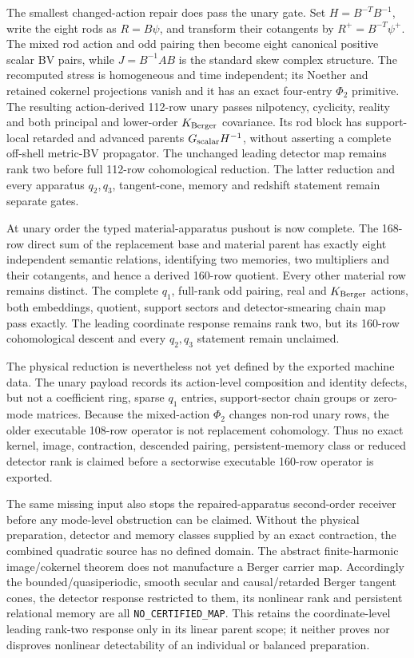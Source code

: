 \documentclass[11pt]{article}
\theoremstyle{definition}
\theoremstyle{remark}
\begin{document}
The smallest changed-action repair does pass the unary gate.  Set
\(H=B^{-T}B^{-1}\), write the eight rods as \(R=B\psi\), and transform
their cotangents by \(R^+=B^{-T}\psi^+\).  The mixed rod action and odd
pairing then become eight canonical positive scalar BV pairs, while
\(J=B^{-1}AB\) is the standard skew complex structure.  The recomputed
stress is homogeneous and time independent; its Noether and retained
cokernel projections vanish and it has an exact four-entry
\(\Phi_2\) primitive.  The resulting action-derived 112-row unary passes
nilpotency, cyclicity, reality and both principal and lower-order
\(K_{\rm Berger}\) covariance.  Its rod block has support-local retarded
and advanced parents \(G_{\rm scalar}H^{-1}\), without asserting a complete
off-shell metric-BV propagator.  The unchanged leading detector map remains
rank two before full 112-row cohomological reduction.  The latter reduction
and every apparatus \(q_2,q_3\), tangent-cone, memory and redshift statement
remain separate gates.

At unary order the typed material-apparatus pushout is now complete.  The
168-row direct sum of the replacement base and material parent has exactly
eight independent semantic relations, identifying two memories, two
multipliers and their cotangents, and hence a derived 160-row quotient.
Every other material row remains distinct.  The complete \(q_1\), full-rank
odd pairing, real and \(K_{\rm Berger}\) actions, both embeddings, quotient,
support sectors and detector-smearing chain map pass exactly.  The leading
coordinate response remains rank two, but its 160-row cohomological descent
and every \(q_2,q_3\) statement remain unclaimed.

The physical reduction is nevertheless not yet defined by the exported
machine data.  The unary payload records its action-level composition and
identity defects, but not a coefficient ring, sparse \(q_1\) entries,
support-sector chain groups or zero-mode matrices.  Because the mixed-action
\(\Phi_2\) changes non-rod unary rows, the older executable 108-row operator is
not replacement cohomology.  Thus no exact kernel, image, contraction,
descended pairing, persistent-memory class or reduced detector rank is
claimed before a sectorwise executable 160-row operator is exported.

The same missing input also stops the repaired-apparatus second-order
receiver before any mode-level obstruction can be claimed.  Without the
physical preparation, detector and memory classes supplied by an exact
contraction, the combined quadratic source has no defined domain.  The
abstract finite-harmonic image/cokernel theorem does not manufacture a
Berger carrier map.  Accordingly the bounded/quasiperiodic, smooth secular
and causal/retarded Berger tangent cones, the detector response restricted to
them, its nonlinear rank and persistent relational memory are all
\texttt{NO\_CERTIFIED\_MAP}.  This retains the coordinate-level leading rank-two
response only in its linear parent scope; it neither proves nor disproves
nonlinear detectability of an individual or balanced preparation.
\end{document}

